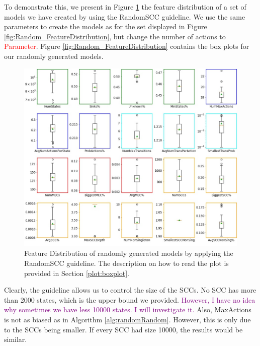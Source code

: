 To demonstrate this, we present in Figure \ref{fig:RandomSCC_FeatureDistributions} the feature distribution of a set of models we have created by using the RandomSCC guideline.
We use the same parameters to create the models as for the set displayed in Figure \ref{fig:Random_FeatureDistribution}, but change 
the number of actions to \textcolor{red}{Parameter}.
Figure \ref{fig:Random_FeatureDistribution} contains the box plots for our randomly generated models.
\begin{figure}[h!]
    \centering
    \includegraphics[width=1\textwidth]{figures/RandomSCC_FeatureDistribution.jpg}
    \caption[Feature Distribution of randomly generated models with the RandomSCC guideline]{
        Feature Distribution of randomly generated models by applying the RandomSCC guideline. The description on how to read the plot is provided in Section \ref{plot:boxplot}.
    }
    \label{fig:RandomSCC_FeatureDistributions}
\end{figure}
\FloatBarrier

\label{insights:sccDistribution}
Clearly, the guideline allows us to control the size of the SCCs. No SCC has more than 2000 states, which is the upper bound we provided.
\textcolor{purple}{However, I have no idea why sometimes we have less 10000 states. I will investigate it.}
Also, MaxActions is not as biased as in Algorithm \ref{alg:randomRandom}. However, this is only due to the SCCs being smaller.
If every SCC had size 10000, the results would be similar.

